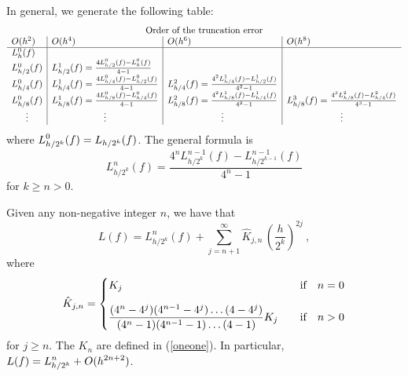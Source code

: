In general, we generate the following table:
\[
\begin{array}{l|l|l|l}
\multicolumn{4}{c}{\text{Order of the truncation error}}\\
O(h^2) & O(h^4) & O(h^6) & O(h^8) \\
\hline
L_h^0 (f) & & & \\
L_{h/2}^0(f) & L_{h/2}^1(f) = \frac{4 L_{h/2}^0(f) - L_h^0(f)}{4-1}
& & \\
L_{h/4}^0(f)
& L_{h/4}^1(f) = \frac{4 L_{h/4}^0(f) - L_{h/2}^0 (f)}{4-1}
& L_{h/4}^2(f) = \frac{4^2 L_{h/4}^1(f)- L_{h/2}^1(f)}{4^2-1} & \\
L_{h/8}^0(f)
& L_{h/8}^1(f) = \frac{4 L_{h/8}^0(f) - L_{h/4}^0(f)}{4-1}
& L_{h/8}^2(f) = \frac{4^2 L_{h/8}^1(f) - L_{h/4}^1(f)}{4^2-1}
& L_{h/8}^3(f) = \frac{4^3 L_{h/8}^2(f) - L_{h/4}^2(f)}{4^3-1} \\
\multicolumn{1}{c|}{\vdots} &
\multicolumn{1}{c|}{\vdots} &
\multicolumn{1}{c|}{\vdots} &
\multicolumn{1}{c}{\vdots}
\end{array}
\]
where $\displaystyle L_{h/2^k}^0(f) = L_{h/2^k}(f)$.  The general formula is
\begin{equation} \label{Richform}
L_{h/2^k}^n(f) = \frac{4^n L_{h/2^k}^{n-1}(f) -
  L_{h/2^{k-1}}^{n-1}(f)}{4^n -1}
\end{equation}
for $k \geq n > 0$.

\begin{prop}
Given any non-negative integer $n$, we have that
\begin{equation} \label{Richard_series}
L(f) = L_{h/2^k}^n(f) + \sum_{j=n+1}^\infty \hat{K}_{j,n}
\,\left(\frac{h}{2^k}\right)^{2j}\ ,
\end{equation}
where
\[
\hat{K}_{j,n} = 
\begin{cases}
K_j & \quad \text{if} \quad n=0 \\[1em]
\displaystyle\frac{(4^n-4^j)(4^{n-1} - 4^j) \ldots (4 - 4^j)}
{(4^n-1)(4^{n-1}-1)\ldots (4-1)} K_j  & \quad \text{if} \quad n>0
\end{cases}
\]
for $j\geq n$.  The $K_n$ are defined in (\ref{oneone}).
In particular, $\displaystyle L(f) = L_{h/2^k}^n + O(h^{2n+2})$.
\end{prop}

